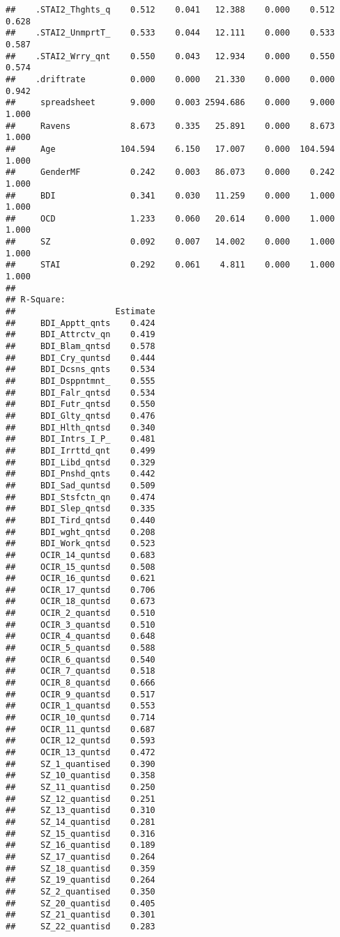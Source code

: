 \documentclass[]{article}
\begin{document}
\begin{verbatim}
##    .STAI2_Thghts_q    0.512    0.041   12.388    0.000    0.512    0.628
##    .STAI2_UnmprtT_    0.533    0.044   12.111    0.000    0.533    0.587
##    .STAI2_Wrry_qnt    0.550    0.043   12.934    0.000    0.550    0.574
##    .driftrate         0.000    0.000   21.330    0.000    0.000    0.942
##     spreadsheet       9.000    0.003 2594.686    0.000    9.000    1.000
##     Ravens            8.673    0.335   25.891    0.000    8.673    1.000
##     Age             104.594    6.150   17.007    0.000  104.594    1.000
##     GenderMF          0.242    0.003   86.073    0.000    0.242    1.000
##     BDI               0.341    0.030   11.259    0.000    1.000    1.000
##     OCD               1.233    0.060   20.614    0.000    1.000    1.000
##     SZ                0.092    0.007   14.002    0.000    1.000    1.000
##     STAI              0.292    0.061    4.811    0.000    1.000    1.000
## 
## R-Square:
##                    Estimate
##     BDI_Apptt_qnts    0.424
##     BDI_Attrctv_qn    0.419
##     BDI_Blam_qntsd    0.578
##     BDI_Cry_quntsd    0.444
##     BDI_Dcsns_qnts    0.534
##     BDI_Dsppntmnt_    0.555
##     BDI_Falr_qntsd    0.534
##     BDI_Futr_qntsd    0.550
##     BDI_Glty_qntsd    0.476
##     BDI_Hlth_qntsd    0.340
##     BDI_Intrs_I_P_    0.481
##     BDI_Irrttd_qnt    0.499
##     BDI_Libd_qntsd    0.329
##     BDI_Pnshd_qnts    0.442
##     BDI_Sad_quntsd    0.509
##     BDI_Stsfctn_qn    0.474
##     BDI_Slep_qntsd    0.335
##     BDI_Tird_qntsd    0.440
##     BDI_wght_qntsd    0.208
##     BDI_Work_qntsd    0.523
##     OCIR_14_quntsd    0.683
##     OCIR_15_quntsd    0.508
##     OCIR_16_quntsd    0.621
##     OCIR_17_quntsd    0.706
##     OCIR_18_quntsd    0.673
##     OCIR_2_quantsd    0.510
##     OCIR_3_quantsd    0.510
##     OCIR_4_quantsd    0.648
##     OCIR_5_quantsd    0.588
##     OCIR_6_quantsd    0.540
##     OCIR_7_quantsd    0.518
##     OCIR_8_quantsd    0.666
##     OCIR_9_quantsd    0.517
##     OCIR_1_quantsd    0.553
##     OCIR_10_quntsd    0.714
##     OCIR_11_quntsd    0.687
##     OCIR_12_quntsd    0.593
##     OCIR_13_quntsd    0.472
##     SZ_1_quantised    0.390
##     SZ_10_quantisd    0.358
##     SZ_11_quantisd    0.250
##     SZ_12_quantisd    0.251
##     SZ_13_quantisd    0.310
##     SZ_14_quantisd    0.281
##     SZ_15_quantisd    0.316
##     SZ_16_quantisd    0.189
##     SZ_17_quantisd    0.264
##     SZ_18_quantisd    0.359
##     SZ_19_quantisd    0.264
##     SZ_2_quantised    0.350
##     SZ_20_quantisd    0.405
##     SZ_21_quantisd    0.301
##     SZ_22_quantisd    0.283

\end{verbatim}
\end{document}
